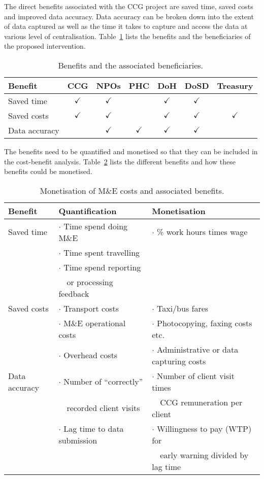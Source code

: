 The direct benefits associated with the CCG project are saved time, saved 
costs and improved data accuracy. Data accuracy can be broken down into 
the extent of data captured as well as the time it takes to capture 
and access the data at various level of centralisation. 
Table~\ref{tbl-benefits} lists the benefits and the beneficiaries of the 
proposed intervention.

\begin{table} \centering
\begin{tabular}{l|c|c|c|c|c|c|}
{\bf Benefit} & CCG & NPOs & PHC & DoH & DoSD & Treasury \\ \hline
Saved time & $\checkmark$ & $\checkmark$ & ~ & $\checkmark$ & $\checkmark$ & ~ \\ 
Saved costs & $\checkmark$ & $\checkmark$ & ~ & $\checkmark$ & $\checkmark$ & $\checkmark$ \\ 
Data accuracy & ~ & $\checkmark$ & $\checkmark$ & $\checkmark$ & $\checkmark$ &  ~  \\ 
\end{tabular}
\caption{Benefits and the associated beneficiaries.}
\label{tbl-benefits}
\end{table}
   
The benefits need to be quantified and monetised so that they can be 
included in the cost-benefit analysis. Table~\ref{tbl:benefits_monetisation} 
lists the different benefits and how these benefits could be monetised.

\begin{table} \centering
\begin{tabular}{|l|l|l|} \hline
{\bf Benefit} & {\bf Quantification} & {\bf Monetisation} \\ \hline
Saved time & $\cdot$ Time spend doing M\&E & $\cdot$ \% work hours times wage\\
~ & $\cdot$ Time spent travelling & ~\\
~ & $\cdot$ Time spend reporting & ~\\ 
~ & ~~or processing feedback & ~\\ \hline
Saved costs & $\cdot$ Transport costs & $\cdot$ Taxi/bus fares\\
~ & $\cdot$ M\&E operational costs & $\cdot$ Photocopying, faxing costs etc.\\
~ & $\cdot$ Overhead costs & $\cdot$ Administrative or data capturing costs\\ \hline
Data accuracy & $\cdot$ Number of ``correctly''  & $\cdot$ Number of client visit times \\
~ & ~~recorded client visits & ~~CCG remuneration per client\\
~ & $\cdot$ Lag time to data submission & $\cdot$ Willingness to pay (WTP) for\\~ & ~ & ~~early warning divided by lag time\\\hline 
\end{tabular}
\caption{Monetisation of M\&E costs and associated benefits.}
\label{tbl:benefits_monetisation}
\end{table}

